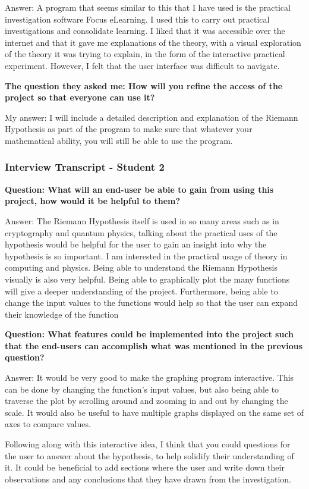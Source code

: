 \documentclass[12pt]{article}
\begin{document}
Answer: A program that seems similar to this that I have used is the practical investigation software Focus eLearning. I used this to carry out practical investigations and consolidate learning. I liked that it was accessible over the internet and that it gave me explanations of the theory, with a visual exploration of the theory it was trying to explain, in the form of the interactive practical experiment. However, I felt that the user interface was difficult to navigate.

\textbf{The question they asked me: How will you refine the access of the project so that everyone can use it?}

My answer: I will include a detailed description and explanation of the Riemann Hypothesis as part of the program to make sure that whatever your mathematical ability, you will still be able to use the program.

\subsubsection{Interview Transcript - Student 2}

\textbf{Question: What will an end-user be able to gain from using this project, how would it be helpful to them?}

Answer: The Riemann Hypothesis itself is used in so many areas such as in cryptography and quantum physics, talking about the practical uses of the hypothesis would be helpful for the user to gain an insight into why the hypothesis is so important.  I am interested in the practical usage of theory in computing and physics. Being able to understand the Riemann Hypothesis visually is also very helpful. Being able to graphically plot the many functions will give a deeper understanding of the project. Furthermore, being able to change the input values to the functions would help so that the user can expand their knowledge of the function

\textbf{Question: What features could be implemented into the project such that the end-users can accomplish what was mentioned in the previous question?}

Answer: It would be very good to make the graphing program interactive. This can be done by changing the function’s input values, but also being able to traverse the plot by scrolling around and zooming in and out by changing the scale. It would also be useful to have multiple graphs displayed on the same set of axes to compare values.

Following along with this interactive idea, I think that you could questions for the user to answer about the hypothesis, to help solidify their understanding of it. It could be beneficial to add sections where the user and write down their observations and any conclusions that they have drawn from the investigation.
\end{document}

